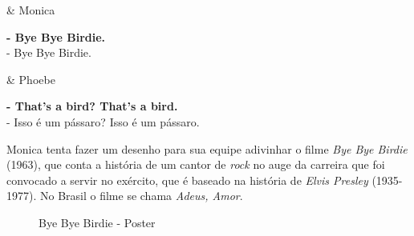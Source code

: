 \begin{tcolorbox}[enhanced,center upper,
    drop fuzzy shadow southeast, boxrule=0.3pt,
    lower separated=false, breakable,
    colframe=black!30!dialogoBorder,colback=white]
\begin{minipage}[c]{0.16\linewidth}
   & \centering \scriptsize{Monica}
\end{minipage}
\hfill
\begin{minipage}[c]{0.8\linewidth}
  \textbf{- Bye Bye Birdie.}\\
  - Bye Bye Birdie.
\end{minipage}

\medskip
\begin{minipage}[c]{0.16\linewidth}
   & \centering \scriptsize{Phoebe}
\end{minipage}
\hfill
\begin{minipage}[c]{0.8\linewidth}
  \textbf{- That's a bird? That's a bird.}\\
  - Isso é um pássaro? Isso é um pássaro.
\end{minipage}
\end{tcolorbox}

Monica tenta fazer um desenho para sua equipe adivinhar o filme
\emph{Bye Bye Birdie} (1963), que conta a história de um cantor de
\emph{rock} no auge da carreira que foi convocado a servir no exército,
que é baseado na história de \emph{Elvis Presley} (1935-1977). No Brasil
o filme se chama \emph{Adeus, Amor}.

\begin{figure}
  \centering
    \caption{Bye Bye Birdie - Poster\label{fig:bye-bye-birdie-poster}}
\end{figure}

